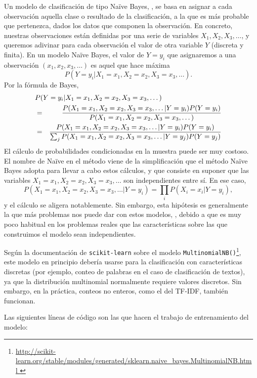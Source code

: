 Un modelo de clasificación de tipo Naïve Bayes, \cite{notas_antonio}, se basa en asignar
a cada observación aquella clase o resultado de la clasificación, a la que es más probable que
pertenezca, dados los datos que componen la observación. En concreto, nuestras observaciones
están definidas por una serie de variables $X_1, X_2, X_3,\dots$, y queremos adivinar para cada
observación el valor de otra variable $Y$ (discreta y finita).
En un modelo Naïve Bayes, el valor de $Y=y_i$ 
que asignaremos a una observación $(x_1, x_2,x_3,\dots)$ es aquel que hace máxima
$$P(Y=y_i|X_1=x_1,X_2=x_2,X_3=x_3,\dots).$$
Por la fórmula de Bayes,
\begin{eqnarray*}
\lefteqn{P(Y=y_i|X_1=x_1,X_2=x_2,X_3=x_3,\dots)}\\
 &=& \frac{P(X_1=x_1,X_2=x_2,X_3=x_3,\dots|Y=y_i)P(Y=y_i)}
{P(X_1=x_1,X_2=x_2,X_3=x_3,\dots)}\\
&=&\frac{P(X_1=x_1,X_2=x_2,X_3=x_3,\dots|Y=y_i)P(Y=y_i)}
{\sum_jP(X_1=x_1,X_2=x_2,X_3=x_3,\dots|Y=y_j)P(Y=y_j)}
\end{eqnarray*}
El cálculo de probabilidades condicionadas en la muestra puede ser muy costoso. El nombre 
de Naïve en el método viene de la simplificación que el método Naïve Bayes adopta para
llevar a cabo estos cálculos, y que consiste en suponer que 
las variables  $X_1=x_1,X_2=x_2,X_3=x_3,\dots$
son independientes entre sí. En ese caso, 
$$P(X_1=x_1,X_2=x_2,X_3=x_3,\dots|Y=y_i) = \prod_i P(X_i=x_i|Y=y_i),$$
y el cálculo se aligera notablemente. Sin embargo, esta hipótesis es generalmente la que más
problemas nos puede dar con estos modelos, \cite{nltk_book}, debido a que es muy poco habitual
en los problemas reales que las características sobre las que construimos el modelo sean 
independientes.

Según la documentación de {\tt  scikit-learn} sobre el modelo {\tt MultinomialNB()}\footnote{\url{http://scikit-learn.org/stable/modules/generated/sklearn.naive_bayes.MultinomialNB.html }},
este modelo en principio debería usarse para la clasificación con características discretas
(por ejemplo, conteo de palabras en el caso de clasificación de textos), ya que la distribución
multinomial normalmente requiere valores discretos. Sin embargo, en la práctica, 
conteos no enteros, como el del TF-IDF, también funcionan.


Las siguientes líneas de código son las que hacen el trabajo de entrenamiento del modelo:


